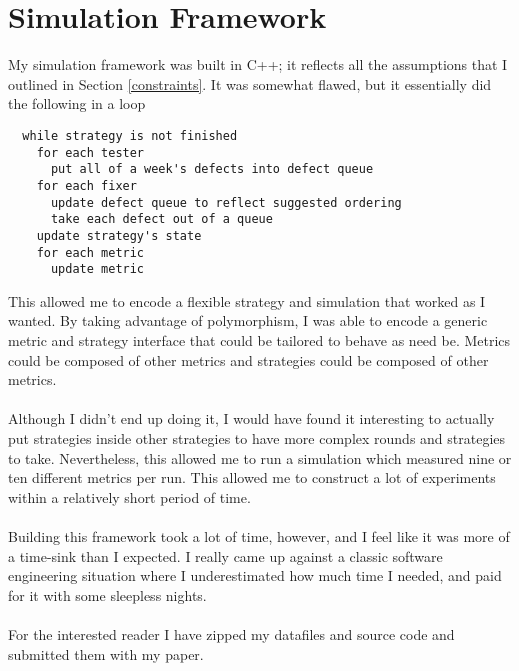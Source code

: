 \section{Simulation Framework} \label{simframe}

My simulation framework was built in C++; it reflects all the assumptions that I
outlined in Section \ref{constraints}.
It was somewhat flawed, but it essentially did the following in a loop
\begin{verbatim}
  while strategy is not finished
    for each tester
      put all of a week's defects into defect queue
    for each fixer
      update defect queue to reflect suggested ordering
      take each defect out of a queue
    update strategy's state
    for each metric
      update metric
\end{verbatim}

This allowed me to encode a flexible strategy and simulation that worked as I
wanted.
By taking advantage of polymorphism, I was able to encode a generic metric and
strategy interface that could be tailored to behave as need be.
Metrics could be composed of other metrics and strategies could be composed of
other metrics.\\
\\
Although I didn't end up doing it, I would have found it interesting to actually
put strategies inside other strategies to have more complex rounds and
strategies to take.
Nevertheless, this allowed me to run a simulation which measured nine or ten
different metrics per run.
This allowed me to construct a lot of experiments within a relatively short
period of time.\\
\\
Building this framework took a lot of time, however, and I feel like it was more
of a time-sink than I expected.
I really came up against a classic software engineering situation where I
underestimated how much time I needed, and paid for it with some sleepless
nights.\\
\\
For the interested reader I have zipped my datafiles and source code and
submitted them with my paper.
